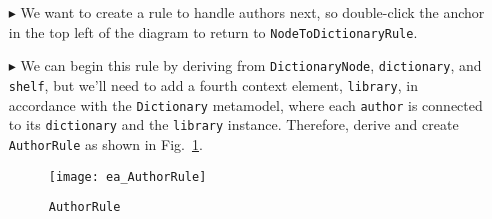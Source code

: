 \begin{itemize}
You can see that for every \texttt{entryNode}, \texttt{contentNode} and \texttt{indexNode} child elements are also created. When transforming from a tree to
dictionary, these are identified by their 0 and 1 indices. As such, the rule's first two constraints are used to ensure that this information is not
lost, guaranteeing their correct positions in the tree when transforming back.

\vspace{0.5cm}

The final constraint however, is a one that we haven't used before. If you re-examine your source \texttt{tree.xmi} model, you'll notice that every entry has a
different \texttt{index} value. This prevented us from setting an attribute constraint on \texttt{entryNode}, but, as long as its index wasn't 0 indicating a
\texttt{titleNode} (as constrained in the previous \texttt{NodeToDictionaryRule}), it didn't matter. Unfortunately, this missing information means any new
\texttt{entryNode}s created in the backward transformation have a free index value, and \emph{could} be mistaken by the rule. By introducing
\texttt{setDefaultNumber}, we have declared that any empty \texttt{index} attributes will be set to 2.

\subsubsection{AuthorRule} %

\item[$\blacktriangleright$] We want to create a rule to handle authors next, so double-click the anchor in the top left of the diagram to return to
\texttt{NodeToDictionaryRule}.

\item[$\blacktriangleright$] We can begin this rule by deriving from \texttt{DictionaryNode}, \texttt{dictionary}, and \texttt{shelf}, but we'll need to add a
fourth context element, \texttt{library}, in accordance with the \texttt{Dictionary} metamodel, where each \texttt{author} is connected to its \texttt{dictionary} and
the \texttt{library} instance. Therefore, derive and create \texttt{AuthorRule} as shown in Fig.~\ref{ea:AuthorRule}.

\vspace{0.5cm}

\begin{figure}[h]
  \hspace{-2cm}
  \texttt{[image: ea\_AuthorRule]}
  \caption{\texttt{AuthorRule}}
  \label{ea:AuthorRule}
\end{figure}

\end{itemize}

